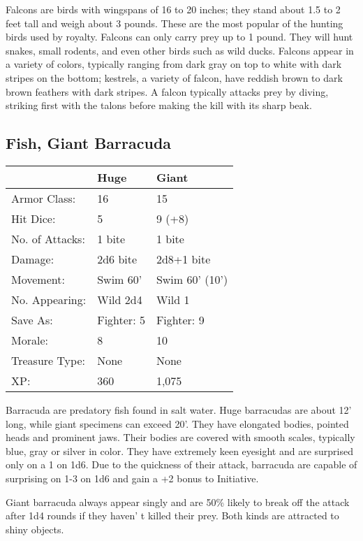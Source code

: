 \documentclass[a4paper,twoside,openany,10pt]{book}
\begin{document}
\begin{multicols}{2}
Falcons
are birds with wingspans of 16 to 20 inches; they stand about 1.5 to 2 feet tall and weigh about 3 pounds. These are the most popular of the hunting birds used by royalty. Falcons can only carry prey up to 1 pound. They will hunt snakes, small rodents, and even other birds such as wild ducks. Falcons appear in a variety of colors, typically ranging from dark gray on top to white with dark stripes on the bottom; kestrels, a variety of falcon, have reddish brown to dark brown feathers with dark stripes. A falcon typically attacks prey by diving, striking first with the talons before making the kill with its sharp beak.


\subsection*{Fish, Giant Barracuda}\label{fish-giant-barracuda}

\begin{tabularx}{0.48\textwidth}{@{}llX@{}}
& Huge & Giant \\\hline
Armor Class: & 16 & 15 \\\hline
Hit Dice: & 5 & 9 (+8) \\\hline
No. of Attacks: & 1 bite & 1 bite \\\hline
Damage: & 2d6 bite & 2d8+1 bite \\\hline
Movement: & Swim 60' & Swim 60'
(10') \\\hline
No. Appearing: & Wild 2d4 & Wild 1 \\\hline
Save As: & Fighter: 5 & Fighter: 9 \\\hline
Morale: & 8 & 10 \\\hline
Treasure Type: & None & None \\\hline
XP: & 360 & 1,075 \\\hline
\end{tabularx}\medskip

Barracuda are predatory fish found in salt water. Huge barracudas are about 12' long, while giant specimens can exceed 20'. They have elongated bodies, pointed heads and prominent jaws. Their bodies are covered with smooth scales, typically blue, gray or silver in color. They have extremely keen eyesight and are surprised only on a 1 on 1d6. Due to the quickness of their attack, barracuda are capable of surprising on 1-3 on 1d6 and gain a +2 bonus to Initiative.

Giant barracuda always appear singly and are 50\% likely to break off the attack after 1d4 rounds if they haven' t killed their prey. Both kinds are attracted to shiny objects.


\end{multicols}
\end{document}
